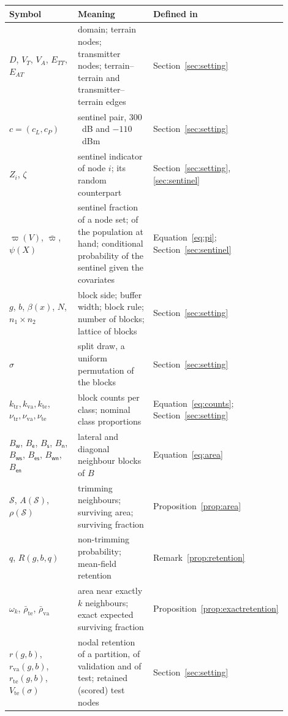 \begin{tabular}{>{\raggedright\arraybackslash}p{0.30\linewidth}>{\raggedright\arraybackslash}p{0.38\linewidth}>{\raggedright\arraybackslash}p{0.22\linewidth}}
\toprule
\textbf{Symbol} & \textbf{Meaning} & \textbf{Defined in} \\
\midrule
$D$, $V_T$, $V_A$, $E_{TT}$, $E_{AT}$ & domain; terrain nodes; transmitter nodes; terrain--terrain and transmitter--terrain edges & Section~\ref{sec:setting} \\
$c = (c_L, c_P)$ & sentinel pair, $300$~dB and $-110$~dBm & Section~\ref{sec:setting} \\
$Z_i$, $\zeta$ & sentinel indicator of node $i$; its random counterpart & Section~\ref{sec:setting}, \ref{sec:sentinel} \\
$\varpi(V)$, $\bar\varpi$, $\psi(X)$ & sentinel fraction of a node set; of the population at hand; conditional probability of the sentinel given the covariates & Equation~\eqref{eq:pi}; Section~\ref{sec:sentinel} \\
$g$, $b$, $\beta(x)$, $N$, $n_1 \times n_2$ & block side; buffer width; block rule; number of blocks; lattice of blocks & Section~\ref{sec:setting} \\
$\sigma$ & split draw, a uniform permutation of the blocks & Section~\ref{sec:setting} \\
$k_{\mathrm{tr}}, k_{\mathrm{va}}, k_{\mathrm{te}}$, $\nu_{\mathrm{tr}}, \nu_{\mathrm{va}}, \nu_{\mathrm{te}}$ & block counts per class; nominal class proportions & Equation~\eqref{eq:counts}; Section~\ref{sec:setting} \\
$B_{\mathsf{w}}$, $B_{\mathsf{e}}$, $B_{\mathsf{s}}$, $B_{\mathsf{n}}$, $B_{\mathsf{ws}}$, $B_{\mathsf{es}}$, $B_{\mathsf{wn}}$, $B_{\mathsf{en}}$ & lateral and diagonal neighbour blocks of $B$ & Equation~\eqref{eq:area} \\
$\mathcal{S}$, $A(\mathcal{S})$, $\rho(\mathcal{S})$ & trimming neighbours; surviving area; surviving fraction & Proposition~\ref{prop:area} \\
$q$, $R(g,b,q)$ & non-trimming probability; mean-field retention & Remark~\ref{prop:retention} \\
$\omega_k$, $\bar\rho_{\mathrm{te}}$, $\bar\rho_{\mathrm{va}}$ & area near exactly $k$ neighbours; exact expected surviving fraction & Proposition~\ref{prop:exactretention} \\
$r(g,b)$, $r_{\mathrm{va}}(g,b)$, $r_{\mathrm{te}}(g,b)$, $V_{\mathrm{te}}(\sigma)$ & nodal retention of a partition, of validation and of test; retained (scored) test nodes & Section~\ref{sec:setting} \\

\end{tabular}
